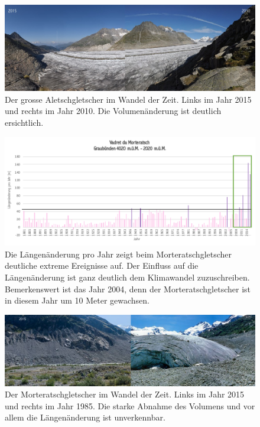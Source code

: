 \begin{refsection}
\begin{figure}
\centering
\includegraphics[width=1.0\textwidth]{extrem/Aletsch.jpg}
\caption{Der grosse Aletschgletscher im Wandel der Zeit. Links im Jahr 2015 und rechts im Jahr 2010. Die Volumenänderung ist deutlich ersichtlich.}
\label{Aletsch}
\end{figure}


\begin{figure}
\centering
\includegraphics[width=1.0\textwidth]{extrem/Morteratsch.pdf}
\caption{Die Längenänderung pro Jahr zeigt beim Morteratschgletscher deutliche extreme Ereignisse auf. Der Einfluss auf die Längenänderung ist ganz deutlich dem Klimawandel zuzuschreiben. Bemerkenswert ist das Jahr 2004, denn der Morteratschgletscher ist in diesem Jahr um 10 Meter gewachsen.}
\label{Morteratschtab}
\end{figure}


\begin{figure}
\centering
\includegraphics[width=1.0\textwidth]{extrem/Morteratsch.jpg}
\caption{Der Morteratschgletscher im Wandel der Zeit. Links im Jahr 2015 und rechts im Jahr 1985. Die starke Abnahme des Volumens und vor allem die Längenänderung ist unverkennbar.}
\label{Morteratsch}
\end{figure}








\printbibliography[heading=subbibliography]
\end{refsection}
